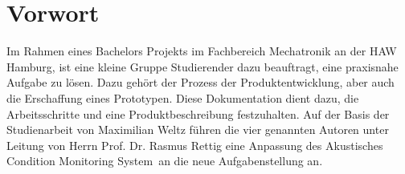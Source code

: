 \section{Vorwort}

Im Rahmen eines Bachelors Projekts im Fachbereich Mechatronik an der HAW Hamburg, ist eine kleine Gruppe Studierender dazu beauftragt, eine praxisnahe Aufgabe zu lösen. Dazu gehört der Prozess der Produktentwicklung, aber auch die Erschaffung eines Prototypen. Diese Dokumentation dient dazu, die Arbeitsschritte und eine Produktbeschreibung festzuhalten. Auf der Basis der Studienarbeit von Maximilian Weltz führen die vier genannten Autoren unter Leitung von Herrn Prof. Dr. Rasmus Rettig eine Anpassung des \glqq Akustisches Condition Monitoring System\grqq\ an die neue Aufgabenstellung an.
\newpage